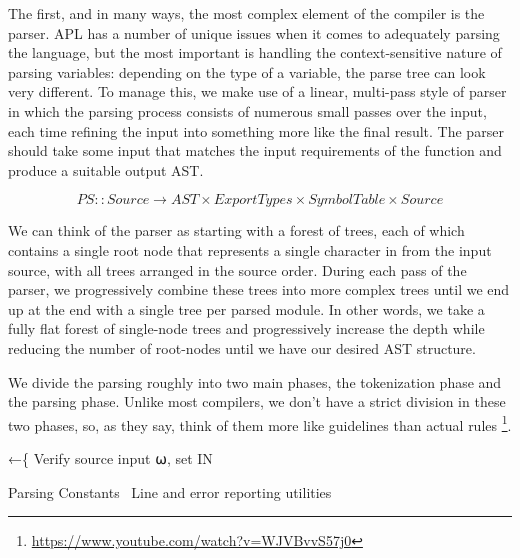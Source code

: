 \documentclass{article}%
\begin{document}
The first, and in many ways, the most complex element of the 
compiler is the parser.
APL has a number of unique issues when it comes to adequately 
parsing the language,
but the most important is handling the context-sensitive 
nature of parsing variables: depending on the type of a variable,
the parse tree can look very different.
To manage this, we make use of a linear, multi-pass style of 
parser in which the parsing process consists of numerous small 
passes over the input, each time refining the input into something
more like the final result.
The parser should take some input that matches the input requirements
of the {\Tt{}\nwendquote} function and produce a suitable output AST.

$$PS :: Source → AST × ExportTypes × SymbolTable × Source$$

\noindent
We can think of the parser as starting with a forest of trees, 
each of which contains a single root node that represents a single
character in from the input source,
with all trees arranged in the source order.
During each pass of the parser, we progressively combine these 
trees into more complex trees until we end up at the end with a 
single tree per parsed module.
In other words, we take a fully flat forest of single-node trees 
and progressively increase the depth while reducing the number of 
root-nodes until we have our desired AST structure.

We divide the parsing roughly into two main phases,
the tokenization phase and the parsing phase. 
Unlike most compilers, we don't have a strict division in these 
two phases, so, as they say, think of them more like guidelines
than actual rules%
\footnote{
        \href{https://www.youtube.com/watch?v=WJVBvvS57j0}
                {https://www.youtube.com/watch?v=WJVBvvS57j0}
}.

\nwenddocs{}\endmoddef\nwstartdeflinemarkup{}\nwenddeflinemarkup
{}←\{
        \LA{}Verify source input \code{}⍵\edoc{}, set \code{}IN\edoc{}~{\nwtagstyle{}}\RA{}
        
        \LA{}Parsing Constants~{\nwtagstyle{}}\RA{}
        \LA{}Line and error reporting utilities~{\nwtagstyle{}}\RA{}
\end{document}
